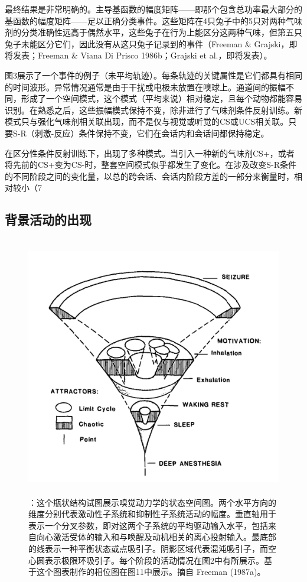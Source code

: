 \documentclass[a4paper,12pt]{article}
\newcommand{\longcaption}[2]{\caption[#1]{\textbf{#1}：#2}}
\begin{document}
最终结果是非常明确的。主导基函数的幅度矩阵——即那个包含总功率最大部分的基函数的幅度矩阵——足以正确分类事件。这些矩阵在4只兔子中的5只对两种气味剂的分类准确性远高于偶然水平，这些兔子在行为上能区分这两种气味，但第五只兔子未能区分它们，因此没有从这只兔子记录到的事件（Freeman \& Grajski，即将发表；Freeman \& Viana Di Prisco 1986b；Grajski et al.，即将发表）。

图3展示了一个事件的例子（未平均轨迹）。每条轨迹的关键属性是它们都具有相同的时间波形。异常情况通常是由于干扰或电极未放置在嗅球上。通道间的振幅不同，形成了一个空间模式，这个模式（平均来说）相对稳定，且每个动物都能容易识别。在熟悉之后，这些振幅模式保持不变，除非进行了气味剂条件反射训练。新模式只与强化气味剂相关联出现，而不是仅与视觉或听觉的CS或UCS相关联。只要S-R（刺激-反应）条件保持不变，它们在会话内和会话间都保持稳定。

在区分性条件反射训练下，出现了多种模式。当引入一种新的气味剂CS+，或者将先前的CS+变为CS-时，整套空间模式似乎都发生了变化。在涉及改变S-R条件的不同阶段之间的变化量，以总的跨会话、会话内阶段方差的一部分来衡量时，相对较小（7%

\subsection{背景活动的出现}

\begin{figure}[ht]
    \centering
    \includegraphics[height=4.5in]{images/fig4.jpg}
    \longcaption{}{这个瓶状结构试图展示嗅觉动力学的状态空间图。两个水平方向的维度分别代表激动性子系统和抑制性子系统活动的幅度。垂直轴用于表示一个分叉参数，即对这两个子系统的平均驱动输入水平，包括来自向心激活受体的输入和与唤醒及动机相关的离心投射输入。最底部的线表示一种平衡状态或点吸引子。阴影区域代表混沌吸引子，而空心圆表示极限环吸引子。每个阶段的活动情况在图2中有所展示。基于这个图表制作的相位图在图11中展示。摘自 Freeman (1987a)。}
\end{figure}
\end{document}
